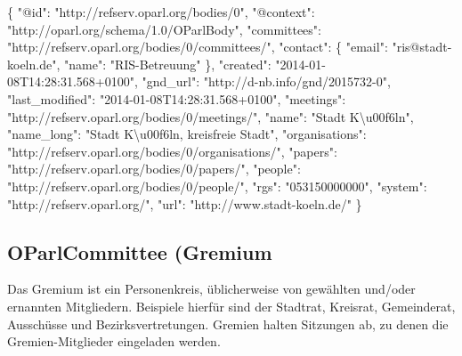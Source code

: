 \documentclass[,a4paper]{article}
\newenvironment{Shaded}{}{}
\newcommand{\DataTypeTok}[1]{\textcolor[rgb]{0.56,0.13,0.00}{{#1}}}
\newcommand{\StringTok}[1]{\textcolor[rgb]{0.25,0.44,0.63}{{#1}}}
\newcommand{\NormalTok}[1]{{#1}}
\begin{document}
\begin{Shaded}
\begin{Highlighting}[]
\NormalTok{\{}
    \DataTypeTok{"@id"}\NormalTok{: }\StringTok{"http://refserv.oparl.org/bodies/0"}\NormalTok{,}
    \DataTypeTok{"@context"}\NormalTok{: }\StringTok{"http://oparl.org/schema/1.0/OParlBody"}\NormalTok{,}
    \DataTypeTok{"committees"}\NormalTok{: }\StringTok{"http://refserv.oparl.org/bodies/0/committees/"}\NormalTok{,}
    \DataTypeTok{"contact"}\NormalTok{: \{}
        \DataTypeTok{"email"}\NormalTok{: }\StringTok{"ris@stadt-koeln.de"}\NormalTok{,}
        \DataTypeTok{"name"}\NormalTok{: }\StringTok{"RIS-Betreuung"}
    \NormalTok{\}, }
    \DataTypeTok{"created"}\NormalTok{: }\StringTok{"2014-01-08T14:28:31.568+0100"}\NormalTok{,}
    \DataTypeTok{"gnd_url"}\NormalTok{: }\StringTok{"http://d-nb.info/gnd/2015732-0"}\NormalTok{,}
    \DataTypeTok{"last_modified"}\NormalTok{: }\StringTok{"2014-01-08T14:28:31.568+0100"}\NormalTok{,}
    \DataTypeTok{"meetings"}\NormalTok{: }\StringTok{"http://refserv.oparl.org/bodies/0/meetings/"}\NormalTok{,}
    \DataTypeTok{"name"}\NormalTok{: }\StringTok{"Stadt K\textbackslash{}u00f6ln"}\NormalTok{,}
    \DataTypeTok{"name_long"}\NormalTok{: }\StringTok{"Stadt K\textbackslash{}u00f6ln, kreisfreie Stadt"}\NormalTok{,}
    \DataTypeTok{"organisations"}\NormalTok{: }\StringTok{"http://refserv.oparl.org/bodies/0/organisations/"}\NormalTok{,}
    \DataTypeTok{"papers"}\NormalTok{: }\StringTok{"http://refserv.oparl.org/bodies/0/papers/"}\NormalTok{,}
    \DataTypeTok{"people"}\NormalTok{: }\StringTok{"http://refserv.oparl.org/bodies/0/people/"}\NormalTok{,}
    \DataTypeTok{"rgs"}\NormalTok{: }\StringTok{"053150000000"}\NormalTok{,}
    \DataTypeTok{"system"}\NormalTok{: }\StringTok{"http://refserv.oparl.org/"}\NormalTok{,}
    \DataTypeTok{"url"}\NormalTok{: }\StringTok{"http://www.stadt-koeln.de/"}
\NormalTok{\}}
\end{Highlighting}
\end{Shaded}

\subsection{OParlCommittee (Gremium}

Das Gremium ist ein Personenkreis, üblicherweise von gewählten und/oder
ernannten Mitgliedern. Beispiele hierfür sind der Stadtrat, Kreisrat,
Gemeinderat, Ausschüsse und Bezirksvertretungen. Gremien halten
Sitzungen ab, zu denen die Gremien-Mitglieder eingeladen werden.
\end{document}
